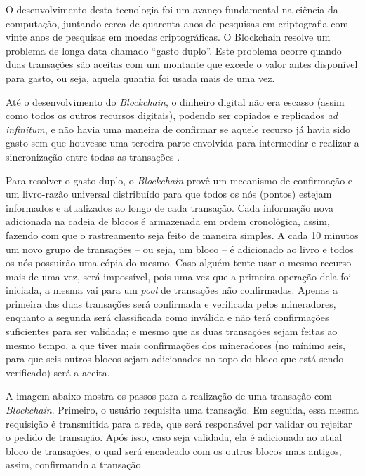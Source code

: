 O desenvolvimento desta tecnologia foi um avanço fundamental na ciência da computação, juntando cerca de quarenta anos de pesquisas em criptografia com vinte anos de pesquisas em moedas criptográficas. \cite{Swan2015} O Blockchain resolve um problema de longa data chamado “gasto duplo”. Este problema ocorre quando duas transações são aceitas com um montante que excede o valor antes disponível para gasto, ou seja, aquela quantia foi usada mais de uma vez.

Até o desenvolvimento do \textit{Blockchain}, o dinheiro digital não era escasso (assim como todos os outros recursos digitais), podendo ser copiados e replicados \textit{ad infinitum}, e não havia uma ­maneira de confirmar se aquele recurso já havia sido gasto sem que houvesse uma terceira parte envolvida para intermediar e realizar a sincronização entre todas as transações \cite{Swan2015}.

Para resolver o gasto duplo, o \textit{Blockchain} provê um mecanismo de confirmação e um livro-razão universal distribuído para que todos os nós (pontos) estejam informados e atualizados ao longo de cada transação. Cada informação nova adicionada na cadeia de blocos é armazenada em ordem cronológica, assim, fazendo com que o rastreamento seja feito de maneira simples. A cada 10 minutos um novo grupo de transações – ou seja, um bloco – é adicionado ao livro e todos os nós possuirão uma cópia do mesmo. Caso alguém tente usar o mesmo recurso mais de uma vez, será impossível, pois uma vez que a primeira operação dela foi iniciada, a mesma vai para um \textit{pool} de transações não confirmadas. Apenas a primeira das duas transações será confirmada e verificada pelos mineradores, enquanto a segunda será classificada como inválida e não terá confirmações suficientes para ser validada; e mesmo que as duas transações sejam feitas ao mesmo tempo, a que tiver mais confirmações dos mineradores (no mínimo seis, para que seis outros blocos sejam adicionados no topo do bloco que está sendo verificado) será a aceita.

A imagem abaixo mostra os passos para a realização de uma transação com \textit{Blockchain}. Primeiro, o usuário requisita uma transação. Em seguida, essa mesma requisição é transmitida para a rede, que será responsável por validar ou rejeitar o pedido de transação. Após isso, caso seja validada, ela é adicionada ao atual bloco de transações, o qual será encadeado com os outros blocos mais antigos, assim, confirmando a transação.

